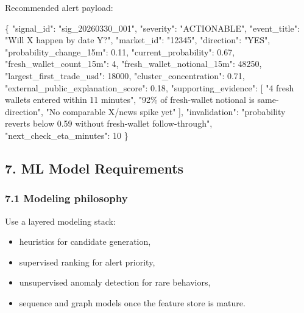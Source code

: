 \documentclass[
]{article}
\newenvironment{Shaded}{}{}
\newcommand{\DataTypeTok}[1]{\textcolor[rgb]{0.56,0.13,0.00}{#1}}
\newcommand{\DecValTok}[1]{\textcolor[rgb]{0.25,0.63,0.44}{#1}}
\newcommand{\FloatTok}[1]{\textcolor[rgb]{0.25,0.63,0.44}{#1}}
\newcommand{\FunctionTok}[1]{\textcolor[rgb]{0.02,0.16,0.49}{#1}}
\newcommand{\OtherTok}[1]{\textcolor[rgb]{0.00,0.44,0.13}{#1}}
\newcommand{\StringTok}[1]{\textcolor[rgb]{0.25,0.44,0.63}{#1}}
\providecommand{\tightlist}{%
  \setlength{\itemsep}{0pt}\setlength{\parskip}{0pt}}
\begin{document}
Recommended alert payload:

\begin{Shaded}
\begin{Highlighting}[]
\FunctionTok{\{}
  \DataTypeTok{"signal\_id"}\FunctionTok{:} \StringTok{"sig\_20260330\_001"}\FunctionTok{,}
  \DataTypeTok{"severity"}\FunctionTok{:} \StringTok{"ACTIONABLE"}\FunctionTok{,}
  \DataTypeTok{"event\_title"}\FunctionTok{:} \StringTok{"Will X happen by date Y?"}\FunctionTok{,}
  \DataTypeTok{"market\_id"}\FunctionTok{:} \StringTok{"12345"}\FunctionTok{,}
  \DataTypeTok{"direction"}\FunctionTok{:} \StringTok{"YES"}\FunctionTok{,}
  \DataTypeTok{"probability\_change\_15m"}\FunctionTok{:} \FloatTok{0.11}\FunctionTok{,}
  \DataTypeTok{"current\_probability"}\FunctionTok{:} \FloatTok{0.67}\FunctionTok{,}
  \DataTypeTok{"fresh\_wallet\_count\_15m"}\FunctionTok{:} \DecValTok{4}\FunctionTok{,}
  \DataTypeTok{"fresh\_wallet\_notional\_15m"}\FunctionTok{:} \DecValTok{48250}\FunctionTok{,}
  \DataTypeTok{"largest\_first\_trade\_usd"}\FunctionTok{:} \DecValTok{18000}\FunctionTok{,}
  \DataTypeTok{"cluster\_concentration"}\FunctionTok{:} \FloatTok{0.71}\FunctionTok{,}
  \DataTypeTok{"external\_public\_explanation\_score"}\FunctionTok{:} \FloatTok{0.18}\FunctionTok{,}
  \DataTypeTok{"supporting\_evidence"}\FunctionTok{:} \OtherTok{[}
    \StringTok{"4 fresh wallets entered within 11 minutes"}\OtherTok{,}
    \StringTok{"92\% of fresh{-}wallet notional is same{-}direction"}\OtherTok{,}
    \StringTok{"No comparable X/news spike yet"}
  \OtherTok{]}\FunctionTok{,}
  \DataTypeTok{"invalidation"}\FunctionTok{:} \StringTok{"probability reverts below 0.59 without fresh{-}wallet follow{-}through"}\FunctionTok{,}
  \DataTypeTok{"next\_check\_eta\_minutes"}\FunctionTok{:} \DecValTok{10}
\FunctionTok{\}}
\end{Highlighting}
\end{Shaded}

\subsection{7. ML Model Requirements}\label{7-ml-model-requirements}

\subsubsection{7.1 Modeling philosophy}\label{71-modeling-philosophy}

Use a layered modeling stack:

\begin{itemize}
\tightlist
\item
  heuristics for candidate generation,
\item
  supervised ranking for alert priority,
\item
  unsupervised anomaly detection for rare behaviors,
\item
  sequence and graph models once the feature store is mature.
\end{itemize}
\end{document}
